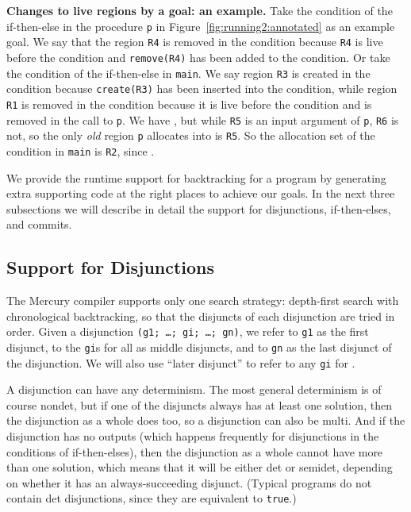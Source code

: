 \documentclass{tlp}
\newcommand{\code}[1]{{\tt#1}}
\begin{document}
\noindent\textbf{Changes to live regions by a goal: an example.}
Take the condition of the if-then-else in the procedure \code{p}
in Figure~\ref{fig:running2:annotated} as an example goal.
We say that the region \code{R4} is removed in the condition
because \code{R4} is live before the condition
and \code{remove(R4)} has been added to the condition.
Or take the condition of the if-then-else in \code{main}.
We say region \code{R3} is created in the condition
because \code{create(R3)} has been inserted into the condition,
while region \code{R1} is removed in the condition
because it is live before the condition
and is removed in the call to \code{p}.
We have ,
but while \code{R5} is an input argument of \code{p}, \code{R6} is not,
so the only \emph{old} region \code{p} allocates into is \code{R5}.
So the allocation set of the condition in \code{main} is \code{R2},
since .

We provide the runtime support for backtracking for a program
by generating extra supporting code at the right places to achieve our goals.
In the next three subsections we will describe in detail
the support for disjunctions, if-then-elses, and commits.

\subsection{Support for Disjunctions}
\label{seCsupportnondetCdisjunction}

The Mercury compiler supports only one search strategy:
depth-first search with chronological backtracking,
so that the disjuncts of each disjunction are tried in order.
Given a disjunction \code{(g1; \ldots; gi; \ldots; gn)},
we refer to \code{g1} as the first disjunct,
to the \code{gi}s for all  as middle disjuncts,
and to \code{gn} as the last disjunct of the disjunction.
We will also use ``later disjunct'' to refer to any \code{gi} for .

A disjunction can have any determinism.
The most general determinism is of course nondet,
but if one of the disjuncts always has at least one solution,
then the disjunction as a whole does too,
so a disjunction can also be multi.
And if the disjunction has no outputs
(which happens frequently for disjunctions in the conditions of if-then-elses),
then the disjunction as a whole cannot have more than one solution,
which means that it will be either det or semidet,
depending on whether it has an always-succeeding disjunct.
(Typical programs do not contain det disjunctions,
since they are equivalent to \code{true}.)
\end{document}
